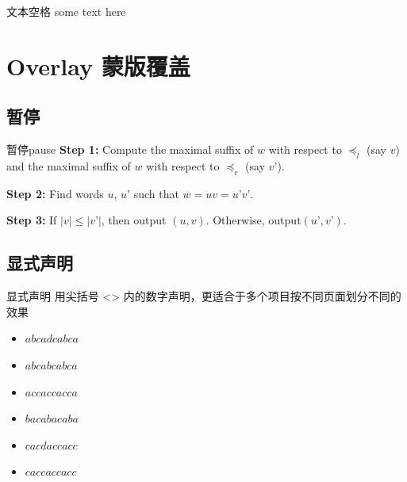 \documentclass[UTF8,14pt,aspectratio=43,dvipsnames,svgnames,x11names,hyperref={urlcolor=blue}]{beamer}
\begin{document}
\begin{frame}{文本空格}
	some \hskip20pt text here  %
\end{frame}

\section[Overlay 蒙板覆盖]{Overlay 蒙版覆盖}
\subsection[暂停]{暂停}
\begin{frame}{暂停}{pause}
	\textbf{Step 1:} Compute the maximal suffix of $w$
	with respect to $\preceq_l$ (say $v$) and the
	maximal suffix of $w$ with respect to $\preceq_r$
	(say $v’$).\\
	
	\pause
	
	\textbf{Step 2:} Find words $u$, $u’$ such that
	$w = uv = u’v’$.\\
	
	\pause
	
	\textbf{Step 3:} If $|v| \le |v’|$, then output
	$(u,v)$. Otherwise, output$(u’,v’)$.
\end{frame}

\subsection[显式声明]{显式声明}
\begin{frame}{显式声明}
	用尖括号 <> 内的数字声明，更适合于多个项目按不同页面划分不同的效果
	\begin{itemize}[<+->]  %
		\item<1> $abcadcabca$\\
		\item<1-2> $abcabcabca$\\
		\item<1-2> $accaccacca$\\
		\item<1> $bacabacaba$\\
		\item<1,3> $cacdaccacc$\\
		\item<1-2> $caccaccacc$
	\end{itemize}
\end{frame}
\end{document}
